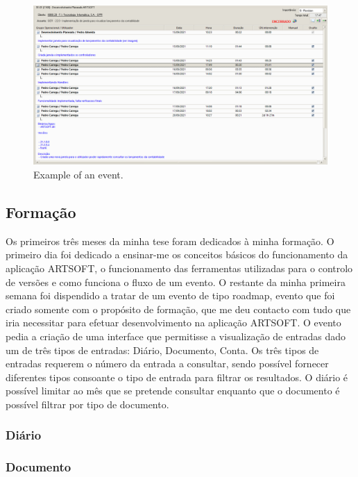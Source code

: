 \documentclass[sigplan]{acmart}
\begin{document}
\begin{figure}[htbp]
	\centerline{\includegraphics[width=\linewidth]{figures/evento_formacao.png}}
	\caption{Example of an event.}
	\label{fig1}
\end{figure}

\subsection{Formação}

Os primeiros três meses da minha tese foram dedicados à minha formação. O primeiro dia foi dedicado a ensinar-me os conceitos básicos do funcionamento da aplicação ARTSOFT, o funcionamento das ferramentas utilizadas para o controlo de versões e como funciona o fluxo de um evento. O restante da minha primeira semana foi dispendido a tratar de um evento de tipo roadmap, evento que foi criado somente com o propósito de formação, que me deu contacto com tudo que iria necessitar para efetuar desenvolvimento na aplicação ARTSOFT. O evento pedia a criação de uma interface que permitisse a visualização de entradas dado um de três tipos de entradas: Diário, Documento, Conta. Os três tipos de entradas requerem o número da entrada a consultar, sendo possível fornecer diferentes tipos consoante o tipo de entrada para filtrar os resultados. O diário é possível limitar ao mês que se pretende consultar enquanto que o documento é possível filtrar por tipo de documento. 

\subsubsection{Diário}

\subsubsection{Documento}
\end{document}
